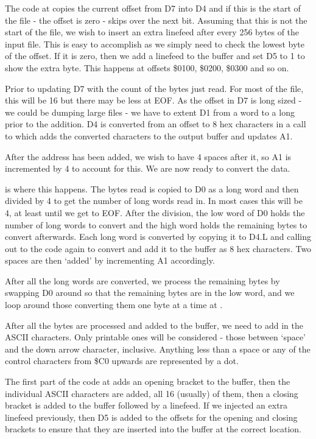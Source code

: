 The code at  copies the current offset from D7 into D4 and if this is the start of the file - the offset is zero - skips over the next bit. Assuming that this is not the start of the file, we wish to insert an extra linefeed after every 256 bytes of the input file. This is easy to accomplish as we simply need to check the lowest byte of the offset. If it is zero, then we add a linefeed to the buffer and set D5 to 1 to show the extra byte. This happens at offsets \$0100, \$0200, \$0300 and so on.

Prior to updating D7 with the count of the bytes just read. For most of the file, this will be 16 but there may be less at EOF. As the offset in D7 is long sized - we could be dumping large files - we have to extent D1 from a word to a long prior to the addition. D4 is converted from an offset to 8 hex characters in a call to  which adds the converted characters to the output buffer and updates A1.

After the address has been added, we wish to have 4 spaces after it, so A1 is incremented by 4 to account for this. We are now ready to convert the data.

 is where this happens. The bytes read is copied to D0 as a long word and then divided by 4 to get the number of long words read in. In most cases this will be 4, at least until we get to EOF. After the division, the low word of D0 holds the number of long words to convert and the high word holds the remaining bytes to convert afterwards. Each long word is converted by copying it to D4.L and calling out to the  code again to convert and add it to the buffer as 8 hex characters. Two spaces are then `added' by incrementing A1 accordingly.

After all the long words are converted, we process the remaining bytes by swapping D0 around so that the remaining bytes are in the low word, and we loop around those converting them one byte at a time at .

After all the bytes are processed and added to the buffer, we need to add in the ASCII characters. Only printable ones will be considered - those between `space' and the down arrow character, inclusive. Anything less than a space or any of the control characters from \$C0 upwards are represented by a dot.

The first part of the code at  adds an opening bracket to the buffer, then the individual ASCII characters are added, all 16 (usually) of them, then a closing bracket is added to the buffer followed by a linefeed. If we injected an extra linefeed previously, then D5 is added to the offsets for the opening and closing brackets to ensure that they are inserted into the buffer at the correct location.

